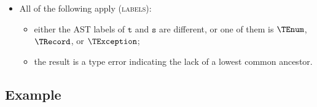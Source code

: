 \documentclass{book}
\newcommand\vt[0]{\texttt{t}}
\newcommand\vs[0]{\texttt{s}}
\begin{document}
\begin{itemize}
\begin{itemize}
    \item All of the following apply (\textsc{labels}):
    \begin{itemize}
      \item either the AST labels of $\vt$ and $\vs$ are different, or one of them is $\TEnum$, $\TRecord$, or $\TException$;
      \item the result is a type error indicating the lack of a lowest common ancestor.
    \end{itemize}
  \end{itemize}
\end{itemize}

\subsection{Example}

\end{document}
